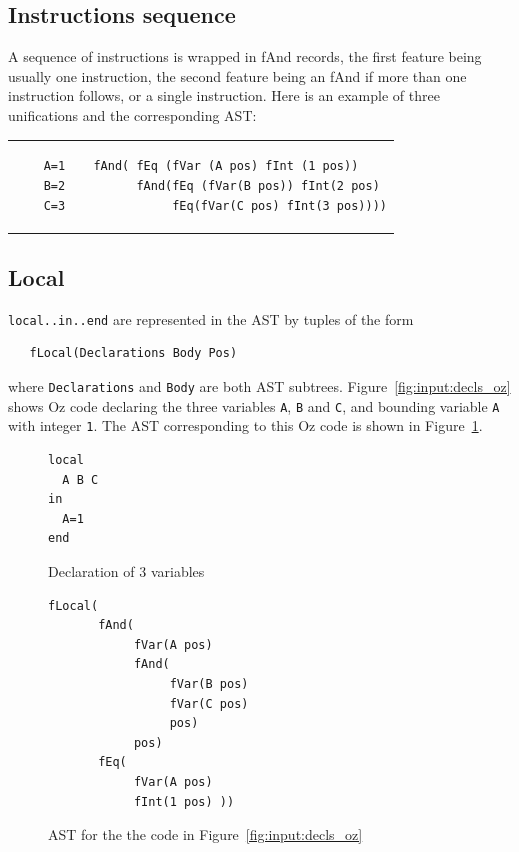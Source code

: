 \documentclass[a4paper]{memoir}
\begin{document}
\subsection{Instructions sequence}
A sequence of instructions is wrapped in fAnd records, the first feature being usually one instruction, the second feature being an fAnd if more than one instruction follows,  or a single instruction. 
Here is an example of three unifications and the corresponding AST:\\
\begin{tabular}{ p{} p{} }
  \begin{lstlisting}
    A=1
    B=2
    C=3
  \end{lstlisting}
&
  \footnotesize{
  \begin{lstlisting}
  fAnd( fEq (fVar (A pos) fInt (1 pos))
        fAnd(fEq (fVar(B pos)) fInt(2 pos) 
             fEq(fVar(C pos) fInt(3 pos))))
  \end{lstlisting}
  }
\end{tabular}

\subsection{Local}\label{sec:input:flocal}
\lstinline!local..in..end! are represented in the AST by tuples of the form
\begin{lstlisting}
   fLocal(Declarations Body Pos)
\end{lstlisting}
where \lstinline!Declarations! and
\lstinline!Body! are both AST subtrees. 
Figure~\ref{fig:input:decls_oz} shows Oz code declaring the three variables
\lstinline!A!, \lstinline!B!
and \lstinline!C!, and bounding variable \lstinline!A! with integer
\lstinline!1!. The AST corresponding to this Oz code is shown in
Figure~\ref{fig:input:decls}.

\begin{figure}
\begin{lstlisting}
local
  A B C
in
  A=1
end
\end{lstlisting}
\caption{Declaration of 3 variables}
\label{fig:input:decls_oz}
\begin{lstlisting}
fLocal(
       fAnd(
            fVar(A pos) 
            fAnd(
                 fVar(B pos) 
                 fVar(C pos) 
                 pos) 
            pos) 
       fEq( 
            fVar(A pos) 
            fInt(1 pos) ))
\end{lstlisting}
\caption{AST for the the code in Figure~\ref{fig:input:decls_oz}}
\label{fig:input:decls}
\end{figure}
\end{document}
